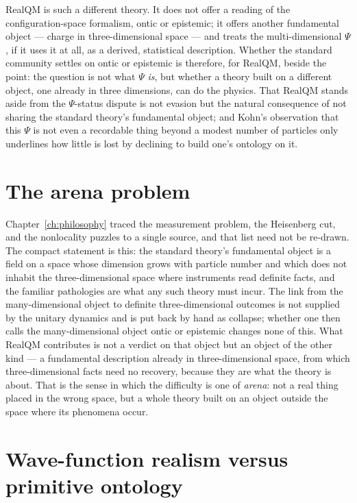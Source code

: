 RealQM is such a different theory. It does not offer a reading of the configuration-space formalism, ontic or
epistemic; it offers another fundamental object --- charge in three-dimensional space --- and treats the
multi-dimensional $\Psi$, if it uses it at all, as a derived, statistical description. Whether the standard
community settles on ontic or epistemic is therefore, for RealQM, beside the point: the question is not what
$\Psi$ \emph{is}, but whether a theory built on a different object, one already in three dimensions, can do the
physics. That RealQM stands aside from the $\Psi$-status dispute is not evasion but the natural consequence of not
sharing the standard theory's fundamental object; and Kohn's observation that this $\Psi$ is not even a recordable
thing beyond a modest number of particles only underlines how little is lost by declining to build one's ontology
on it.

\section{The arena problem}\label{sec:arena-problem}

Chapter~\ref{ch:philosophy} traced the measurement problem, the Heisenberg cut, and the nonlocality puzzles to a
single source, and that list need not be re-drawn. The compact statement is this: the standard theory's
fundamental object is a field on a space whose dimension grows with particle number and which does not inhabit the
three-dimensional space where instruments read definite facts, and the familiar pathologies are what any such
theory must incur. The link from the many-dimensional object to definite three-dimensional outcomes is not
supplied by the unitary dynamics and is put back by hand as collapse; whether one then calls the many-dimensional
object ontic or epistemic changes none of this. What RealQM contributes is not a verdict on that object but an
object of the other kind --- a fundamental description already in three-dimensional space, from which
three-dimensional facts need no recovery, because they are what the theory is about. That is the sense in which
the difficulty is one of \emph{arena}: not a real thing placed in the wrong space, but a whole theory built on an
object outside the space where its phenomena occur.

\section{Wave-function realism versus primitive ontology}\label{sec:wfr-po}

